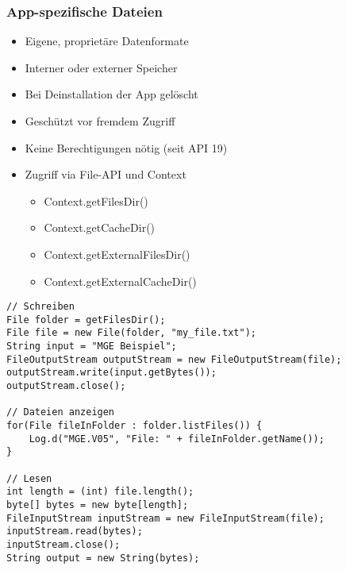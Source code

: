 \subsubsection{App-spezifische Dateien}
\begin{itemize}[topsep=0pt, leftmargin=4mm]
    \setlength\itemsep{-0.3em}
    \item Eigene, proprietäre Datenformate
    \item Interner oder externer Speicher
    \item Bei Deinstallation der App gelöscht
    \item Geschützt vor fremdem Zugriff
    \item Keine Berechtigungen nötig (seit API 19)
    \item Zugriff via File-API und Context
    \begin{itemize}[topsep=0pt, leftmargin=4mm]
        \setlength\itemsep{-0.3em}
        \item Context.getFilesDir()
        \item Context.getCacheDir()
        \item Context.getExternalFilesDir()
        \item Context.getExternalCacheDir()
    \end{itemize}
\end{itemize}
\begin{lstlisting}
// Schreiben
File folder = getFilesDir();
File file = new File(folder, "my_file.txt");
String input = "MGE Beispiel";
FileOutputStream outputStream = new FileOutputStream(file);
outputStream.write(input.getBytes());
outputStream.close();

// Dateien anzeigen
for(File fileInFolder : folder.listFiles()) {
    Log.d("MGE.V05", "File: " + fileInFolder.getName());
}

// Lesen
int length = (int) file.length();
byte[] bytes = new byte[length];
FileInputStream inputStream = new FileInputStream(file);
inputStream.read(bytes);
inputStream.close();
String output = new String(bytes);
\end{lstlisting}
